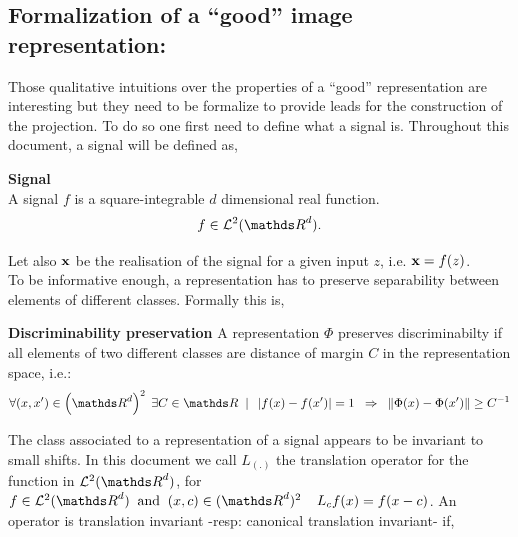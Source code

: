 \documentclass[a4paper,11pt]{report}
\begin{document}
		\subsection{Formalization of a ``good'' image representation:}
      \label{sec:Intro/Image rep/Formalization}
      
      Those qualitative intuitions over the properties of a ``good'' representation are interesting but they need to be formalize to provide leads for the construction of the projection. To do so one first need to define what a signal is. Throughout this document, a signal will be defined as,
			
			\begin{defn} \textbf{Signal}\\ 
				A signal $f$ is a square-integrable $d$ dimensional real function.
				\begin{equation*}
					f \in \mathcal{L}^{2}(\dsR^{d}).
				\end{equation*}
				\label{def:Signal}
			\end{defn}
			
			Let also ${\bf x}$ be the realisation of the signal for a given input $z$, i.e. ${\bf x}=f(z)$.\\%
			
			To be informative enough, a representation has to preserve separability between elements of different classes. Formally this is,
      
			\begin{prop} \textbf{Discriminability preservation}
				A representation $\Phi$ preserves discriminabilty if all elements of two different classes are distance of margin $C$ in the representation space, i.e.:
				\begin{equation*}
					\forall (x,x') \in \left(\dsR^{d}\right)^{2} \; \exists C \in \dsR \;\; | \;\; \abs{f(x)-f(x')} = 1 \;\; \Rightarrow \;\; \norm{\Phi(x)-\Phi(x')} \geq C^{-1} %
				\end{equation*}
				\label{pty:Discriminabilty}
			\end{prop}
			
      The class associated to a representation of a signal appears to be invariant to small shifts. In this document we call $L_{(.)}$ the translation operator for the function in $\mathcal{L}^{2}(\dsR^{d})$, \ie for $f \in \mathcal{L}^{2}(\dsR^{d}) \;\; \text{and} \;\; (x,c) \in (\dsR^{d})^{2} \;\;\;\; L_{c}f(x) = f(x-c)$. An operator is translation invariant -resp: canonical translation invariant- if,
\end{document}

